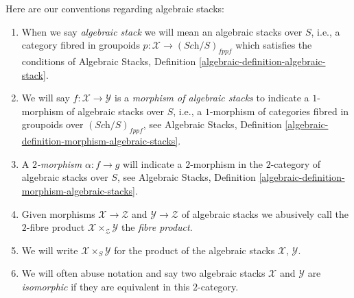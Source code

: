 \medskip\noindent
Here are our conventions regarding algebraic stacks:
\begin{enumerate}
\item When we say {\it algebraic stack} we will mean an algebraic
stacks over $S$, i.e., a category fibred in groupoids
$p : \mathcal{X} \to (\textit{Sch}/S)_{fppf}$
which satisfies the conditions of
Algebraic Stacks, Definition \ref{algebraic-definition-algebraic-stack}.
\item We will say $f : \mathcal{X} \to \mathcal{Y}$ is a
{\it morphism of algebraic stacks} to indicate a $1$-morphism
of algebraic stacks over $S$, i.e., a $1$-morphism of categories fibred
in groupoids over $(\textit{Sch}/S)_{fppf}$, see
Algebraic Stacks,
Definition \ref{algebraic-definition-morphism-algebraic-stacks}.
\item A {\it $2$-morphism} $\alpha : f \to g$ will
indicate a $2$-morphism in the $2$-category of algebraic stacks over
$S$, see
Algebraic Stacks,
Definition \ref{algebraic-definition-morphism-algebraic-stacks}.
\item Given morphisms $\mathcal{X} \to \mathcal{Z}$
and $\mathcal{Y} \to \mathcal{Z}$ of algebraic stacks
we abusively call the $2$-fibre product
$\mathcal{X} \times_{\mathcal{Z}} \mathcal{Y}$ the {\it fibre product}.
\item We will write $\mathcal{X} \times_S \mathcal{Y}$ for the
product of the algebraic stacks $\mathcal{X}$, $\mathcal{Y}$.
\item We will often abuse notation and say two algebraic stacks
$\mathcal{X}$ and $\mathcal{Y}$ are {\it isomorphic} if they are
equivalent in this $2$-category.
\end{enumerate}


